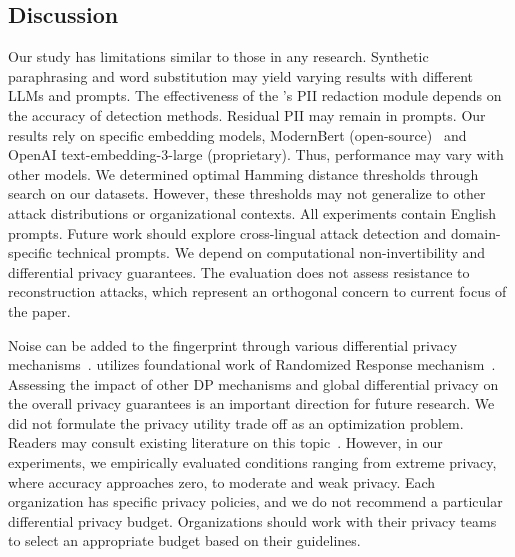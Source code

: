 \subsection{Discussion}  
\label{sec:discussion-and-threats-to-validity}

Our study has limitations similar to those in any research. 
Synthetic paraphrasing and word substitution may yield varying results with different LLMs and prompts. 
The effectiveness of the \tool's PII redaction module depends on the accuracy of detection methods. 
Residual PII may remain in prompts.
%
Our results rely on specific embedding models, ModernBert (open-source)~\cite{warner-etal-2025-smarter, gill2025advancingsemanticcachingllms} and OpenAI text-embedding-3-large (proprietary). 
Thus, performance may vary with other models. 
We determined optimal Hamming distance thresholds through search on our datasets. 
However, these thresholds may not generalize to other attack distributions or organizational contexts.
%
All experiments contain English prompts. 
Future work should explore cross-lingual attack detection and domain-specific technical prompts. 
We depend on computational non-invertibility and differential privacy guarantees. 
The evaluation does not assess resistance to reconstruction attacks, which represent an orthogonal concern to current focus of the paper.


 Noise can be added to the fingerprint through various differential privacy mechanisms~\cite{warner1965randomized, Wang2017Locally, bhowmick2018protection, rappor, feyisetan2021private, vadhan2021concurrent, carvalho2021brr, bollegala2023neighbourhood, xie2024differentially, meehan2022sentence, asi2022optimal, du2023sanitizing, bittau2017prochlo, fanti2016building, hsu2014differential, near_abuah_2021, fioretto2024differential, dwork2014algorithmic, pmlr-v80-balle18a, NIPS2017_253614bb, hu2024sok}. 
%
\tool utilizes foundational work of Randomized Response mechanism~\cite{warner1965randomized}. 
Assessing the impact of other DP mechanisms and global differential privacy on the overall privacy guarantees is an important direction for future research. 
We did not formulate the privacy utility trade off as an optimization problem. 
Readers may consult existing literature on this topic~\cite{near_abuah_2021, Wang2017Locally, dwork2014algorithmic, fioretto2024differential}. 
However, in our experiments, we empirically evaluated conditions ranging from extreme privacy, where accuracy approaches zero, to moderate and weak privacy.
Each organization has specific privacy policies, and we do not recommend a particular differential privacy budget. 
Organizations should work with their privacy teams to select an appropriate budget based on their guidelines.  
